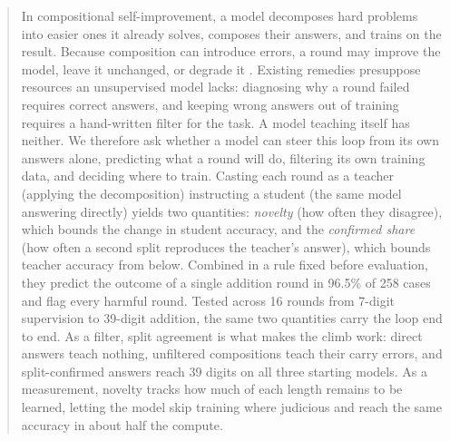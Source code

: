 \begin{abstract}
  In compositional self-improvement, a model decomposes hard problems into
  easier ones it already solves, composes their answers, and trains on the
  result. Because composition can introduce errors, a round may improve the
  model, leave it unchanged, or degrade it \citep{shin2026compositional}.
  Existing remedies presuppose resources an unsupervised model lacks:
  diagnosing why a round failed requires correct answers, and keeping wrong
  answers out of training requires a hand-written filter for the task. A model
  teaching itself has neither. We therefore ask whether a model can steer this
  loop from its own answers alone, predicting what a round will do, filtering
  its own training data, and deciding where to train. Casting each round as a
  teacher (applying the decomposition) instructing a student (the same model
  answering directly) yields two quantities: \emph{novelty} (how often they
  disagree), which bounds the change in student accuracy, and the
  \emph{confirmed share} (how often a second split reproduces the teacher's
  answer), which bounds teacher accuracy from below. Combined in a rule fixed
  before evaluation, they predict the outcome of a single addition round in
  96.5\% of 258 cases and flag every harmful round. Tested across 16 rounds
  from 7-digit supervision to 39-digit addition, the same two quantities carry
  the loop end to end. As a filter, split agreement is what makes the climb
  work: direct answers teach nothing, unfiltered compositions teach their carry
  errors, and split-confirmed answers reach 39 digits on all three starting
  models. As a measurement, novelty tracks how much of each length remains to
  be learned, letting the model skip training where judicious and reach the
  same accuracy in about half the compute.
\end{abstract}
